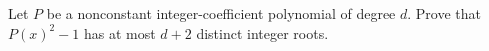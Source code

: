 Let $P$ be a nonconstant integer-coefficient polynomial of degree $d$. Prove that $P(x)^2-1$ has at most $d+2$ distinct integer roots.
